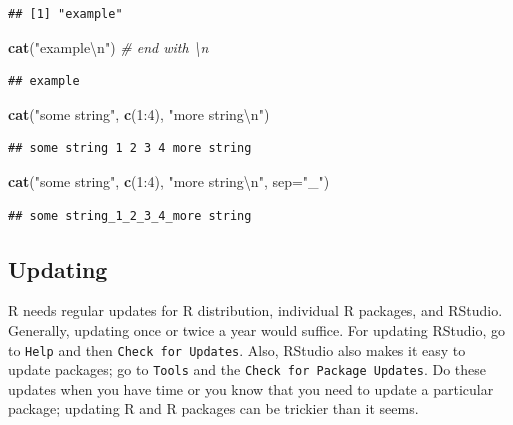 \documentclass[]{book}
\newenvironment{Shaded}{\begin{snugshade}}{\end{snugshade}}
\newcommand{\KeywordTok}[1]{\textcolor[rgb]{0.13,0.29,0.53}{\textbf{{#1}}}}
\newcommand{\DataTypeTok}[1]{\textcolor[rgb]{0.13,0.29,0.53}{{#1}}}
\newcommand{\DecValTok}[1]{\textcolor[rgb]{0.00,0.00,0.81}{{#1}}}
\newcommand{\CharTok}[1]{\textcolor[rgb]{0.31,0.60,0.02}{{#1}}}
\newcommand{\StringTok}[1]{\textcolor[rgb]{0.31,0.60,0.02}{{#1}}}
\newcommand{\CommentTok}[1]{\textcolor[rgb]{0.56,0.35,0.01}{\textit{{#1}}}}
\newcommand{\NormalTok}[1]{{#1}}
\theoremstyle{definition}
\theoremstyle{definition}
\theoremstyle{remark}
\begin{document}
\begin{verbatim}
## [1] "example"
\end{verbatim}

\begin{Shaded}
\begin{Highlighting}[]
\KeywordTok{cat}\NormalTok{(}\StringTok{"example}\CharTok{\textbackslash{}n}\StringTok{"}\NormalTok{)  }\CommentTok{# end with \textbackslash{}n}
\end{Highlighting}
\end{Shaded}

\begin{verbatim}
## example
\end{verbatim}

\begin{Shaded}
\begin{Highlighting}[]
\KeywordTok{cat}\NormalTok{(}\StringTok{"some string"}\NormalTok{, }\KeywordTok{c}\NormalTok{(}\DecValTok{1}\NormalTok{:}\DecValTok{4}\NormalTok{), }\StringTok{"more string}\CharTok{\textbackslash{}n}\StringTok{"}\NormalTok{)}
\end{Highlighting}
\end{Shaded}

\begin{verbatim}
## some string 1 2 3 4 more string
\end{verbatim}

\begin{Shaded}
\begin{Highlighting}[]
\KeywordTok{cat}\NormalTok{(}\StringTok{"some string"}\NormalTok{, }\KeywordTok{c}\NormalTok{(}\DecValTok{1}\NormalTok{:}\DecValTok{4}\NormalTok{), }\StringTok{"more string}\CharTok{\textbackslash{}n}\StringTok{"}\NormalTok{, }\DataTypeTok{sep=}\StringTok{"_"}\NormalTok{)}
\end{Highlighting}
\end{Shaded}

\begin{verbatim}
## some string_1_2_3_4_more string
\end{verbatim}

\subsection{Updating}\label{updating}

R needs regular updates for R distribution, individual R packages, and
RStudio. Generally, updating once or twice a year would suffice. For
updating RStudio, go to \texttt{Help} and then
\texttt{Check\ for\ Updates}. Also, RStudio also makes it easy to update
packages; go to \texttt{Tools} and the
\texttt{Check\ for\ Package\ Updates}. Do these updates when you have
time or you know that you need to update a particular package; updating
R and R packages can be trickier than it seems.
\end{document}
